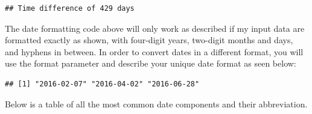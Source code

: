 \documentclass[]{book}
\newenvironment{Shaded}{\begin{snugshade}}{\end{snugshade}}
\newcommand{\KeywordTok}[1]{\textcolor[rgb]{0.13,0.29,0.53}{\textbf{{#1}}}}
\newcommand{\DataTypeTok}[1]{\textcolor[rgb]{0.13,0.29,0.53}{{#1}}}
\newcommand{\StringTok}[1]{\textcolor[rgb]{0.31,0.60,0.02}{{#1}}}
\newcommand{\CommentTok}[1]{\textcolor[rgb]{0.56,0.35,0.01}{\textit{{#1}}}}
\newcommand{\NormalTok}[1]{{#1}}
\begin{document}
\begin{verbatim}
## Time difference of 429 days
\end{verbatim}

The date formatting code above will only work as described if my input
data are formatted exactly as shown, with four-digit years, two-digit
months and days, and hyphens in between. In order to convert dates in a
different format, you will use the format parameter and describe your
unique date format as seen below:

\begin{Shaded}
\end{Shaded}

\begin{verbatim}
## [1] "2016-02-07" "2016-04-02" "2016-06-28"
\end{verbatim}

Below is a table of all the most common date components and their
abbreviation.
\end{document}
